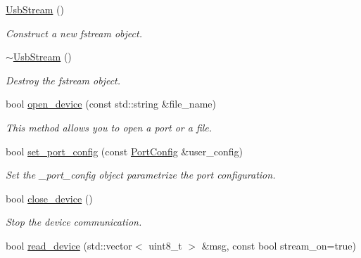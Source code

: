 \begin{DoxyCompactItemize}
\item 
\mbox{\label{classreal__time__tools_1_1UsbStream_aaed92c7077a7eefb866a05990ab3e25c}} 
\hyperlink{classreal__time__tools_1_1UsbStream_aaed92c7077a7eefb866a05990ab3e25c}{Usb\+Stream} ()
\begin{DoxyCompactList}\small\item\em Construct a new fstream object. \end{DoxyCompactList}\item 
\mbox{\label{classreal__time__tools_1_1UsbStream_a4b82b48b6a15abfe115ab831c537df0a}} 
\hyperlink{classreal__time__tools_1_1UsbStream_a4b82b48b6a15abfe115ab831c537df0a}{$\sim$\+Usb\+Stream} ()
\begin{DoxyCompactList}\small\item\em Destroy the fstream object. \end{DoxyCompactList}\item 
bool \hyperlink{classreal__time__tools_1_1UsbStream_a1f6915c42d9742ced10e99d2edf7d8b1}{open\+\_\+device} (const std\+::string \&file\+\_\+name)
\begin{DoxyCompactList}\small\item\em This method allows you to open a port or a file. \end{DoxyCompactList}\item 
bool \hyperlink{classreal__time__tools_1_1UsbStream_adb0c41dc7a9603022a0a1e19c9ab8292}{set\+\_\+port\+\_\+config} (const \hyperlink{classreal__time__tools_1_1PortConfig}{Port\+Config} \&user\+\_\+config)
\begin{DoxyCompactList}\small\item\em Set the \+\_\+port\+\_\+config object parametrize the port configuration. \end{DoxyCompactList}\item 
bool \hyperlink{classreal__time__tools_1_1UsbStream_acea75055bb37f2a7f351300dbaf28d9e}{close\+\_\+device} ()
\begin{DoxyCompactList}\small\item\em Stop the device communication. \end{DoxyCompactList}\item 
bool \hyperlink{classreal__time__tools_1_1UsbStream_a028f39fcd8c97c49aacf48fdaa8302c8}{read\+\_\+device} (std\+::vector$<$ uint8\+\_\+t $>$ \&msg, const bool stream\+\_\+on=true)

\end{DoxyCompactItemize}
